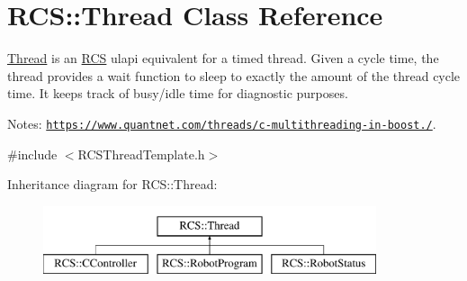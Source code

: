 \hypertarget{classRCS_1_1Thread}{\section{R\-C\-S\-:\-:Thread Class Reference}
\label{classRCS_1_1Thread}
}


\hyperlink{classRCS_1_1Thread}{Thread} is an \hyperlink{namespaceRCS}{R\-C\-S} ulapi equivalent for a timed thread. Given a cycle time, the thread provides a wait function to sleep to exactly the amount of the thread cycle time. It keeps track of busy/idle time for diagnostic purposes. \par
 Notes\-: \href{https://www.quantnet.com/threads/c-multithreading-in-boost.10028/}{\tt https\-://www.\-quantnet.\-com/threads/c-\/multithreading-\/in-\/boost./}.  




{\ttfamily \#include $<$R\-C\-S\-Thread\-Template.\-h$>$}

Inheritance diagram for R\-C\-S\-:\-:Thread\-:\begin{figure}[H]
\begin{center}
\leavevmode
\includegraphics[height=2.000000cm]{classRCS_1_1Thread}
\end{center}
\end{figure}
